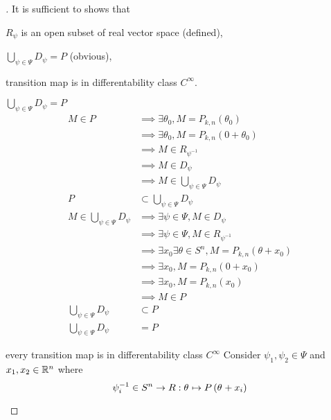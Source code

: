 \documentclass[stu, babel, american, biblatex, a4paper, leqno, draftall]{apa7}
\begin{document}
\begin{proof}[]
    It is sufficient to shows that
    \begin{APAenumerate}
        \item $R_\psi$ is an open subset of real vector space (defined),
        \item $\bigcup_{\psi\in\Psi} D_\psi = P$ (obvious),
        \item transition map is in differentability class $C^\infty$.
    \end{APAenumerate}
    \begin{subproof}{$\bigcup_{\psi\in\Psi} D_\psi = P$}
        \begin{align*}
            M \in P
            & \implies \exists \theta_0, M=P_{k,n}\left(\theta_0\right) \\
            & \implies \exists \theta_0, M=P_{k,n}\left(0 + \theta_0\right) \\
            & \implies M\in R_{\psi^{-1}} \\
            & \implies M\in D_{\psi} \\
            & \implies M\in \bigcup_{\psi\in\Psi} D_\psi \\
            P&\subset\bigcup_{\psi\in\Psi}D_\psi \\
            M\in \bigcup_{\psi\in\Psi} D_\psi
            & \implies \exists \psi\in\Psi, M\in D_\psi \\
            & \implies \exists \psi\in\Psi, M\in R_{\psi^{-1}} \\
            & \implies \exists x_0\exists\theta\in S^n, M=P_{k,n}\left(\theta+x_0\right) \\
            & \implies \exists x_0, M=P_{k,n}\left(0+x_0\right) \\
            & \implies \exists x_0, M=P_{k,n}\left(x_0\right) \\
            & \implies M \in P \\
            \bigcup_{\psi\in\Psi}D_\psi&\subset P \\
            \bigcup_{\psi\in\Psi} D_\psi &= P
        \end{align*}
    \end{subproof}
    \begin{subproof}{every transition map is in differentability class $C^\infty$}
        Consider $\psi_1, \psi_2 \in \Psi$ and $x_1, x_2 \in \mathbb{R}^n$ where
        \begin{equation*}
            \psi_i^{-1}
            \in S^n \to R
            :\tensor{\theta}{}\mapsto P\left(\tensor{\theta}{}+x_i\right)

\end{equation*}
\end{subproof}
\end{proof}
\end{document}
